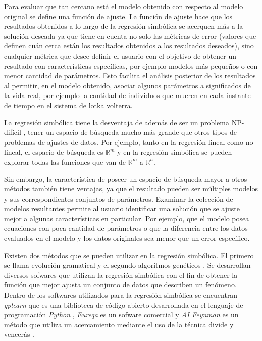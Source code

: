 Para evaluar que tan cercano está el modelo obtenido con respecto al modelo original se define una función de ajuste. La función de ajuste hace que los resultados obtenidos a lo largo de la regresión simbólica se acerquen más a la solución deseada ya que tiene en cuenta no solo las métricas de error (valores que definen cuán cerca están los resultados obtenidos a los resultados deseados), sino cualquier métrica que desee definir el usuario con el objetivo de obtener un resultado con características específicas, por ejemplo modelos más pequeños o con menor cantidad de parámetros. Esto facilita el análisis posterior de los resultados al permitir, en el modelo obtenido, asociar algunos parámetros a significados de la vida real, por ejemplo la cantidad de individuos que mueren en cada instante de tiempo en el sistema de lotka volterra.

La regresión simbólica tiene la desventaja de además de ser un problema NP-difícil \cite{virgolin2022symbolic}, tener un espacio de búsqueda mucho más grande que otros tipos de problemas de ajustes de datos. Por ejemplo, tanto en la regresión lineal como no lineal, el espacio de búsqueda es $\mathbb{R}^m$ y en la regresión simbólica se pueden explorar todas las funciones que van de $\mathbb{R}^m$ a $\mathbb{R}^n$.

Sin embargo, la característica de poseer un espacio de búsqueda mayor a otros métodos también tiene ventajas, ya que el resultado pueden ser múltiples modelos y sus correspondientes conjuntos de parámetros. Examinar la colección de modelos resultantes permite al usuario identificar una solución que se ajuste mejor a algunas características en particular. Por ejemplo, que el modelo posea ecuaciones con poca cantidad de parámetros o que la diferencia entre los datos evaluados en el modelo y los datos originales sea menor que un error específico.

Existen dos métodos que se pueden utilizar en la regresión simbólica. El primero se llama evolución gramatical y el segundo algoritmos genéticos \cite{zelinka2005analytic}. Se desarrollan diversos sofwares que utilizan la regresión simbólica con el fin de obtener la función que mejor ajusta un conjunto de datos que describen un fenómeno. Dentro de los softwares utilizados para la regresión simbólica se encuentran \textit{gplearn} que es una biblioteca de código abierto desarrollada en el lenguaje de programación \textit{Python} \cite{gplearn}, \textit{Eureqa} es un sofware  comercial \cite{schmidt2013eureqa} y \textit{AI Feynman} es un método que utiliza un acercamiento mediante el uso de la técnica divide y vencerás \cite{udrescu2020ai}.

